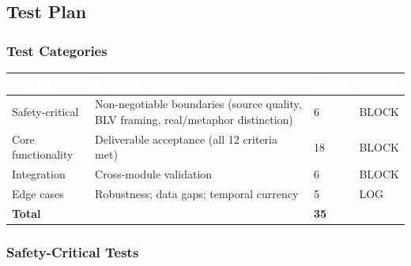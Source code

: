 \documentclass[11pt,letterpaper]{article}
\newcommand{\tableheader}[1]{\textbf{\sffamily\textcolor{white}{#1}}}
\begin{document}
\subsection{Test Plan}

\subsubsection{Test Categories}

\begin{center}
\begin{tabularx}{\textwidth}{L{3cm}XC{1.5cm}C{2cm}}
\toprule
{}
\tableheader{Category} & \tableheader{Purpose} & \tableheader{Count} & \tableheader{Failure} \\
\midrule
Safety-critical & Non-negotiable boundaries (source quality, BLV framing, real/metaphor distinction) & 6 & BLOCK \\
Core functionality & Deliverable acceptance (all 12 criteria met) & 18 & BLOCK \\
Integration & Cross-module validation & 6 & BLOCK \\
Edge cases & Robustness; data gaps; temporal currency & 5 & LOG \\
\midrule
{}
\textbf{Total} & & \textbf{35} & \\
\bottomrule
\end{tabularx}
\end{center}

\subsubsection{Safety-Critical Tests}
\end{document}
